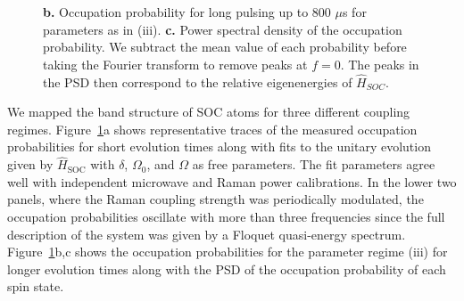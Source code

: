 \begin{figure}[!htb]
\begin{center}
{		{\bf b.} Occupation probability for long pulsing up to 800 $\mu$s for parameters as in (iii). 
		{\bf c.} Power spectral density of the occupation probability. We subtract the mean value of each probability before taking the Fourier transform to remove peaks at $f=0$. The peaks in the PSD then correspond to the relative eigenenergies of $\hat{H}_{SOC}$.
		}
		\label{fig:Figure5}
	\end{center}
\end{figure}
%
We mapped the band structure of SOC atoms for three different coupling regimes. Figure~\ref{fig:Figure5}a shows representative traces of the measured occupation probabilities for short evolution times along with fits to the unitary evolution given by $\hat{H}_{\mathrm{SOC}}$ with $\delta$, $\Omega_0$, and $\Omega$ as free parameters. The fit parameters agree well with independent microwave and Raman power calibrations. In the lower two panels, where the Raman coupling strength was periodically modulated, the occupation probabilities oscillate with more than three frequencies since the full description of the system was given by a Floquet quasi-energy spectrum. Figure~\ref{fig:Figure5}b,c shows the occupation probabilities for the parameter regime (iii) for longer evolution times along with the PSD of the occupation probability of each spin state. 




